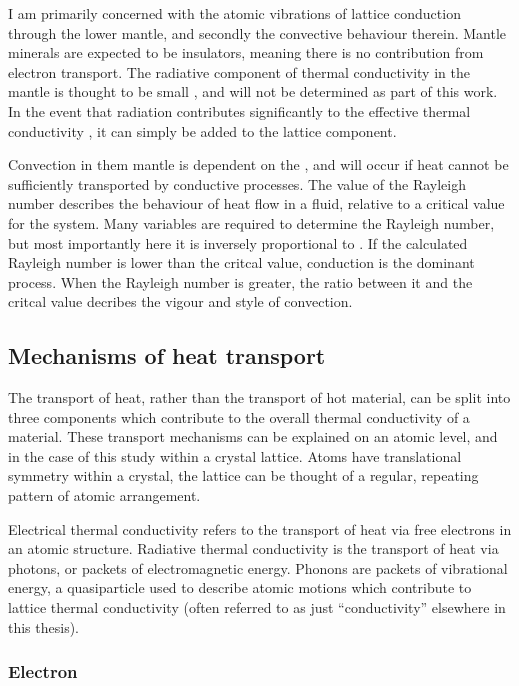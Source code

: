 I am primarily concerned with the atomic vibrations of lattice conduction through the lower mantle, and secondly the convective behaviour therein. Mantle minerals are expected to be insulators, meaning there is no contribution from electron transport. The radiative component of thermal conductivity in the mantle is thought to be small \citep{Goncharov2008}, and will not be determined as part of this work. In the event that radiation contributes significantly to the effective thermal conductivity \citep{Keppler2008}, it can simply be added to the lattice component.

Convection in them mantle is dependent on the \tc, and will occur if heat cannot be sufficiently transported by conductive processes. The value of the Rayleigh number describes the behaviour of heat flow in a fluid, relative to a critical value for the system. Many variables are required to determine the Rayleigh number, but most importantly here it is inversely proportional to \tc. If the calculated Rayleigh number is lower than the critcal value, conduction is the dominant process. When the Rayleigh number is greater, the ratio between it and the critcal value decribes the vigour and style of convection.

\subsection{Mechanisms of heat transport}

The transport of heat, rather than the transport of hot material, can be split into three components which contribute to the overall thermal conductivity of a material. These transport mechanisms can be explained on an atomic level, and in the case of this study within a crystal lattice. Atoms have translational symmetry within a crystal, the lattice can be thought of a regular, repeating pattern of atomic arrangement. 

Electrical thermal conductivity refers to the transport of heat via free electrons in an atomic structure. Radiative thermal conductivity is the transport of heat via photons, or packets of electromagnetic energy. Phonons are packets of vibrational energy, a quasiparticle used to describe atomic motions which contribute to lattice thermal conductivity (often referred to as just ``conductivity'' elsewhere in this thesis).

\subsubsection{Electron}


